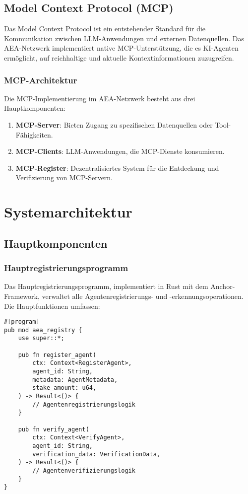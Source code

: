 \documentclass[12pt,a4paper]{article}
\begin{document}
\subsection{Model Context Protocol (MCP)}

Das Model Context Protocol ist ein entstehender Standard für die Kommunikation zwischen LLM-Anwendungen und externen Datenquellen. Das AEA-Netzwerk implementiert native MCP-Unterstützung, die es KI-Agenten ermöglicht, auf reichhaltige und aktuelle Kontextinformationen zuzugreifen.

\subsubsection{MCP-Architektur}

Die MCP-Implementierung im AEA-Netzwerk besteht aus drei Hauptkomponenten:

\begin{enumerate}
\item \textbf{MCP-Server}: Bieten Zugang zu spezifischen Datenquellen oder Tool-Fähigkeiten.
\item \textbf{MCP-Clients}: LLM-Anwendungen, die MCP-Dienste konsumieren.
\item \textbf{MCP-Register}: Dezentralisiertes System für die Entdeckung und Verifizierung von MCP-Servern.
\end{enumerate}

\section{Systemarchitektur}

\subsection{Hauptkomponenten}

\subsubsection{Hauptregistrierungsprogramm}

Das Hauptregistrierungsprogramm, implementiert in Rust mit dem Anchor-Framework, verwaltet alle Agentenregistrierungs- und -erkennungsoperationen. Die Hauptfunktionen umfassen:

\begin{verbatim}
#[program]
pub mod aea_registry {
    use super::*;
    
    pub fn register_agent(
        ctx: Context<RegisterAgent>,
        agent_id: String,
        metadata: AgentMetadata,
        stake_amount: u64,
    ) -> Result<()> {
        // Agentenregistrierungslogik
    }
    
    pub fn verify_agent(
        ctx: Context<VerifyAgent>,
        agent_id: String,
        verification_data: VerificationData,
    ) -> Result<()> {
        // Agentenverifizierungslogik
    }
}
\end{verbatim}
\end{document}
